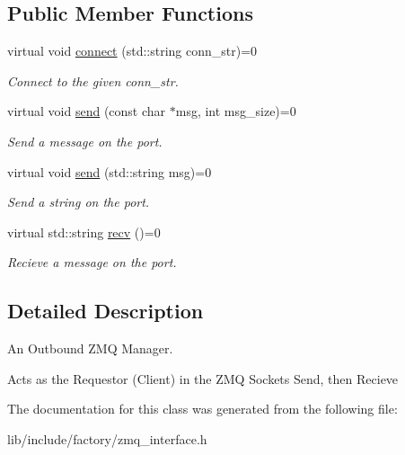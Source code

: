 \subsection*{Public Member Functions}
\begin{DoxyCompactItemize}
\item 
\hypertarget{classZmqOut_ae34b1742c72e0c82ea42315cb68f1a20}{virtual void \hyperlink{classZmqOut_ae34b1742c72e0c82ea42315cb68f1a20}{connect} (std\-::string conn\-\_\-str)=0}\label{classZmqOut_ae34b1742c72e0c82ea42315cb68f1a20}

\begin{DoxyCompactList}\small\item\em Connect to the given conn\-\_\-str. \end{DoxyCompactList}\item 
\hypertarget{classZmqOut_a97935d9e7cbacd2fcb9655433e4b7af4}{virtual void \hyperlink{classZmqOut_a97935d9e7cbacd2fcb9655433e4b7af4}{send} (const char $\ast$msg, int msg\-\_\-size)=0}\label{classZmqOut_a97935d9e7cbacd2fcb9655433e4b7af4}

\begin{DoxyCompactList}\small\item\em Send a message on the port. \end{DoxyCompactList}\item 
\hypertarget{classZmqOut_ac7b314ddf6e0357c31b05fb2b1b91635}{virtual void \hyperlink{classZmqOut_ac7b314ddf6e0357c31b05fb2b1b91635}{send} (std\-::string msg)=0}\label{classZmqOut_ac7b314ddf6e0357c31b05fb2b1b91635}

\begin{DoxyCompactList}\small\item\em Send a string on the port. \end{DoxyCompactList}\item 
\hypertarget{classZmqOut_a02da5e5dd51f99e7d35a3f843b9bd00e}{virtual std\-::string \hyperlink{classZmqOut_a02da5e5dd51f99e7d35a3f843b9bd00e}{recv} ()=0}\label{classZmqOut_a02da5e5dd51f99e7d35a3f843b9bd00e}

\begin{DoxyCompactList}\small\item\em Recieve a message on the port. \end{DoxyCompactList}\end{DoxyCompactItemize}


\subsection{Detailed Description}
An Outbound Z\-M\-Q Manager. 

Acts as the Requestor (Client) in the Z\-M\-Q Sockets Send, then Recieve 

The documentation for this class was generated from the following file\-:\begin{DoxyCompactItemize}
\item 
lib/include/factory/zmq\-\_\-interface.\-h\end{DoxyCompactItemize}
